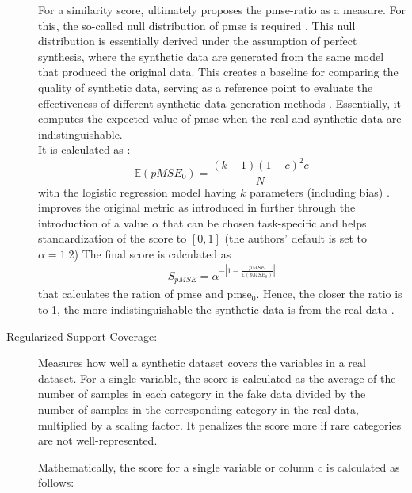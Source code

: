 \begin{description}
  For a similarity score, \textcite{snoke2018GeneralSpecificUtility} ultimately proposes the \gls{pmse}-ratio as a measure.
  For this, the so-called null distribution of \gls{pmse} is required \cite[p. 668]{snoke2018GeneralSpecificUtility}.
  This null distribution is essentially derived under the assumption of perfect synthesis, where the synthetic data are generated from the same \gls{model} that produced the original data. 
  This creates a baseline for comparing the quality of synthetic data, serving as a reference point to evaluate the effectiveness of different synthetic data generation methods \cite{snoke2018GeneralSpecificUtility}.
  Essentially, it computes the expected value of \gls{pmse} when the real and synthetic data are indistinguishable.\\
  It is calculated as \cite{snoke2018GeneralSpecificUtility,chundawat2022UniversalMetricRobust}:
  $$\mathbb{E}(pMSE_0) = \frac{(k-1)(1-c)^2c}{N}$$
  with the logistic regression \gls{model} having $k$ parameters (including bias) \cite{chundawat2022UniversalMetricRobust}.
  \textcite{chundawat2022UniversalMetricRobust} improves the original metric as introduced in \cite{snoke2018GeneralSpecificUtility} further through the introduction
  of a value $\alpha$ that can be chosen task-specific and helps standardization of the score to $[0,1]$ (the authors' default is set to $\alpha=1.2$)
  The final score is calculated as 
  \begin{equation}
    \begin{align*}
      \label{eqn:s_pmse}
      S_{pMSE} = \alpha^{-|1-\frac{pMSE}{\mathbb{E}(pMSE_0)}|}
      \end{align*}
  \end{equation}
  that calculates the ration of \gls{pmse} and \gls{pmse}$_0$.
  Hence, the closer the ratio is to 1, the more indistinguishable the synthetic data is from the real data \cite{chundawat2022UniversalMetricRobust}.
  

  \item[Regularized Support Coverage:]
  Measures how well a synthetic dataset covers the variables in a real dataset. 
  For a single variable, the score is calculated as the average of the number of samples in each category in the fake data 
  divided by the number of samples in the corresponding category in the real data, multiplied by a scaling factor. 
  It penalizes the score more if rare categories are not well-represented. 
  
  Mathematically, the score for a single variable or column $c$ is calculated as follows:


\end{description}
